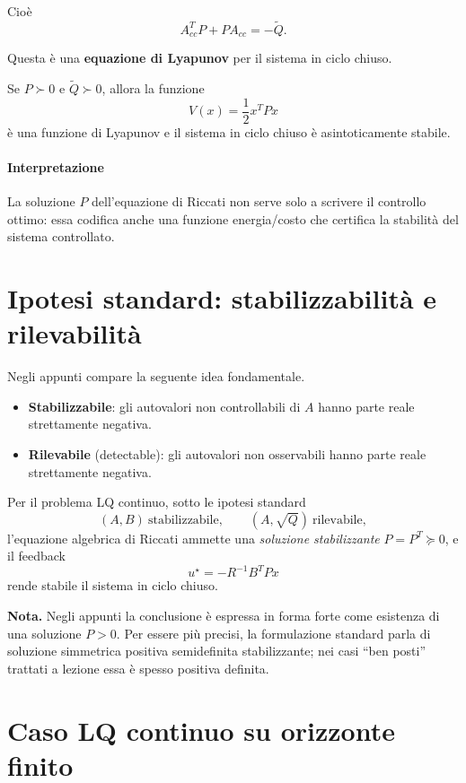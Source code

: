 Cioè
\[
\boxed{
A_{cc}^TP + PA_{cc} = -\widetilde Q.
}
\]

Questa è una \textbf{equazione di Lyapunov} per il sistema in ciclo chiuso.

Se \(P\succ 0\) e \(\widetilde Q \succ 0\), allora la funzione
\[
V(x)=\frac12 x^TPx
\]
è una funzione di Lyapunov e il sistema in ciclo chiuso è asintoticamente stabile.

\paragraph{Interpretazione}
La soluzione \(P\) dell'equazione di Riccati non serve solo a scrivere il controllo ottimo:
essa codifica anche una funzione energia/costo che certifica la stabilità del sistema controllato.

\section{Ipotesi standard: stabilizzabilità e rilevabilità}

Negli appunti compare la seguente idea fondamentale.

\begin{itemize}
    \item \textbf{Stabilizzabile}: gli autovalori non controllabili di \(A\) hanno parte reale strettamente negativa.
    \item \textbf{Rilevabile} (detectable): gli autovalori non osservabili hanno parte reale strettamente negativa.
\end{itemize}

Per il problema LQ continuo, sotto le ipotesi standard
\[
(A,B)\ \text{stabilizzabile},
\qquad
(A,\sqrt Q)\ \text{rilevabile},
\]
l'equazione algebrica di Riccati ammette una \emph{soluzione stabilizzante} \(P=P^T\succeq 0\), e il feedback
\[
u^\star=-R^{-1}B^TPx
\]
rende stabile il sistema in ciclo chiuso.

\medskip

\noindent
\textbf{Nota.}
Negli appunti la conclusione è espressa in forma forte come esistenza di una soluzione \(P>0\).
Per essere più precisi, la formulazione standard parla di soluzione simmetrica positiva semidefinita stabilizzante; nei casi ``ben posti'' trattati a lezione essa è spesso positiva definita.

\section{Caso LQ continuo su orizzonte finito}


